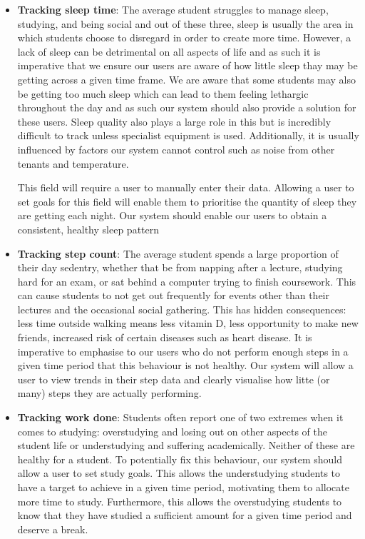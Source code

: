\documentclass[12pt]{article}
\begin{document}
\begin{itemize}

    \item \textbf{Tracking sleep time}: The average student struggles to manage
        sleep, studying, and being social and out of these three, sleep is
        usually the area in which students choose to disregard in order to
        create more time. However, a lack of sleep can be detrimental on all
        aspects of life and as such it is imperative that we ensure our users
        are aware of how little sleep thay may be getting across a given time
        frame. We are aware that some students may also be getting too much
        sleep which can lead to them feeling lethargic throughout the day and
        as such our system should also provide a solution for these users.
        Sleep quality also plays a large role in this but is incredibly
        difficult to track unless specialist equipment is used. Additionally,
        it is usually influenced by factors our system cannot control such as
        noise from other tenants and temperature.

        This field will require a user to manually enter their data. 
        Allowing a user to set
        goals for this field will enable them to prioritise the quantity of
        sleep they are getting each night. Our system should enable our users
        to obtain a consistent, healthy sleep pattern
    
    \item \textbf{Tracking step count}: The average student spends a large
        proportion of their day sedentry, whether that be from napping after a
        lecture, studying hard for an exam, or sat behind a computer trying to
        finish coursework. This can cause students to not get out frequently
        for events other than their lectures and the occasional social
        gathering. This has hidden consequences: less time outside walking
        means less vitamin D, less opportunity to make new friends, increased
        risk of certain diseases such as heart disease. It is imperative to
        emphasise to our users who do not perform enough steps in a given time
        period that this behaviour is not healthy. Our system will allow a user
        to view trends in their step data and clearly visualise how litte (or
        many) steps they are actually performing.

    \item \textbf{Tracking work done}: Students often report one of two
        extremes when it comes to studying: overstudying and losing out on
        other aspects of the student life or understudying and suffering
        academically. Neither of these are healthy for a student. To
        potentially fix this behaviour, our system should allow a user to set
        study goals. This allows the understudying students to have a target to
        achieve in a given time period, motivating them to allocate more time
        to study. Furthermore, this allows the overstudying students to know
        that they have studied a sufficient amount for a given time period and
        deserve a break.
    

\end{itemize}
\end{document}
